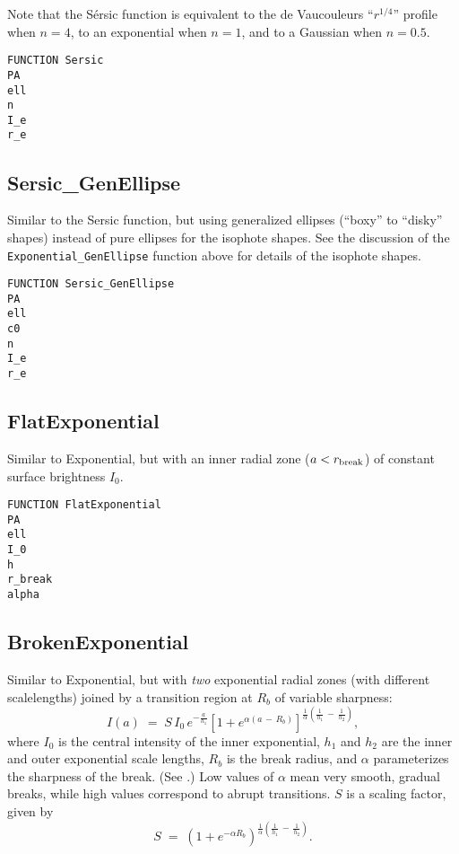 \documentclass[10pt]{article}
\begin{document}
Note that the S\'ersic function is equivalent to the de Vaucouleurs ``$r^{1/4}$'' profile
when $n = 4$, to an exponential when $n = 1$, and to a Gaussian when $n = 0.5$.

\begin{verbatim}
FUNCTION Sersic
PA
ell
n
I_e
r_e
\end{verbatim}


\subsection{Sersic\_GenEllipse}

Similar to the Sersic function, but using generalized ellipses (``boxy'' to
``disky'' shapes) instead of pure ellipses for the isophote shapes.  See the
discussion of the \texttt{Exponential\_GenEllipse} function above for details of the isophote
shapes.

\begin{verbatim}
FUNCTION Sersic_GenEllipse
PA
ell
c0
n
I_e
r_e
\end{verbatim}


\subsection{FlatExponential} 

Similar to Exponential, but with an inner radial zone ($a < r_{\rm break}$)
of constant surface brightness $I_{0}$.

\begin{verbatim}
FUNCTION FlatExponential
PA
ell
I_0
h
r_break
alpha
\end{verbatim}


\subsection{BrokenExponential}

Similar to Exponential, but with \textit{two}
exponential radial zones (with different scalelengths) joined by a transition region
at $R_{b}$ of variable sharpness:
\begin{equation}
	I(a) \; = \; S \, I_{0} \, e^{-\frac{a}{h_{1}}} [1 + e^{\alpha(a \, - \,
	R_{b})}]^{\frac{1}{\alpha} (\frac{1}{h_{1}} \, - \, \frac{1}{h_{2}})},
\end{equation}
where $I_{0}$ is the central intensity of the inner exponential, $h_{1}$ and
$h_{2}$ are the inner and outer exponential scale lengths, $R_{b}$ is the break radius, and
$\alpha$ parameterizes the sharpness of the break.  (See \citet{erwin08}.) Low values of $\alpha$
mean very smooth, gradual breaks, while high values correspond to abrupt
transitions.  $S$ is a scaling factor, given by
\begin{equation}
  S \; = \; (1 + e^{-\alpha R_{b}})^{\frac{1}{\alpha} (\frac{1}{h_{1}} \, - 
  \, \frac{1}{h_{2}})}.
\end{equation}
\end{document}
